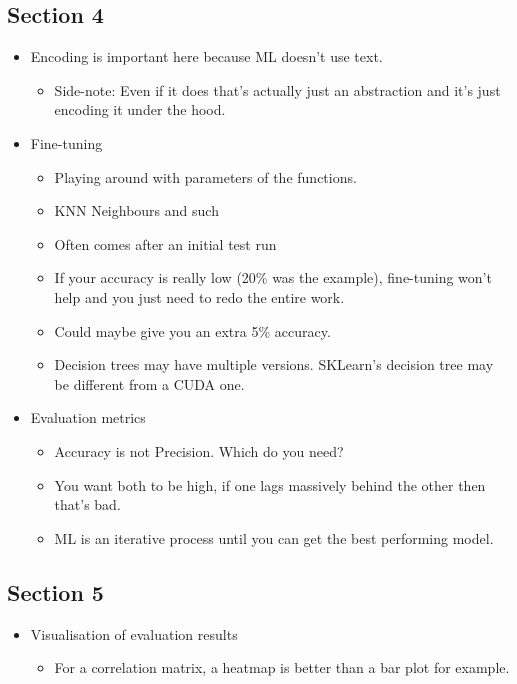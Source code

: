 \documentclass[12pt]{report}
\begin{document}
\subsection{Section 4}
\begin{itemize}
    \item Encoding is important here because ML doesn't use text. \begin{itemize}
        \item Side-note: Even if it does that's actually just an abstraction and it's just encoding it under the hood.
    \end{itemize}
    \item Fine-tuning \begin{itemize}
        \item Playing around with parameters of the functions.
        \item KNN Neighbours and such
        \item Often comes after an initial test run
        \item If your accuracy is really low (20\% was the example), fine-tuning won't help and you just need to redo the entire work.
        \item Could maybe give you an extra 5\% accuracy.
        \item Decision trees may have multiple versions. SKLearn's decision tree may be different from a CUDA one.
    \end{itemize}

    \item Evaluation metrics
    \begin{itemize}
        \item Accuracy is not Precision. Which do you need?
        \item You want both to be high, if one lags massively behind the other then that's bad.
        \item ML is an iterative process until you can get the best performing model.
    \end{itemize}
\end{itemize}

\subsection{Section 5}
    \begin{itemize}
        \item Visualisation of evaluation results
        \begin{itemize}
            \item For a correlation matrix, a heatmap is better than a bar plot for example.
        \end{itemize}
    \end{itemize}
\end{document}
